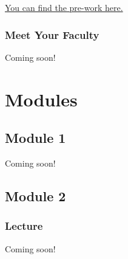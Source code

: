 \documentclass[
]{book}
\begin{document}
\href{https://docs.google.com/forms/d/e/1FAIpQLSeT3dlar3GpewcRe4Yjn5_Do0mR37brQ9eKeWmi2904_Q1AEw/viewform?usp=sf_link}{You can find the pre-work here.}

\hypertarget{meet-your-faculty}{%
\section{Meet Your Faculty}\label{meet-your-faculty}}

Coming soon!

\hypertarget{part-modules}{%
\part{Modules}\label{part-modules}}

\hypertarget{module-1}{%
\chapter{Module 1}\label{module-1}}

Coming soon!

\hypertarget{module-2}{%
\chapter{Module 2}\label{module-2}}

\hypertarget{lecture}{%
\section{Lecture}\label{lecture}}

Coming soon!

  
\end{document}

